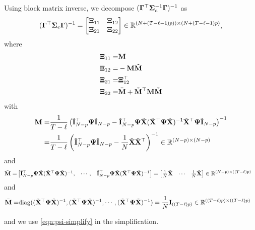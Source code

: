 	Using block matrix inverse, we decompose  $(\bm{\Gamma}^\top \bm{\Sigma}_e^{-1} \bm{\Gamma} )^{-1}$ as 
		\[(\bm{\Gamma}^\top \bm{\Sigma}_e \bm{\Gamma})^{-1} =  \begin{bmatrix} \bm{\Xi}_{11} & \bm{\Xi}_{12} \\ \bm{\Xi}_{21} & \bm{\Xi}_{22} \end{bmatrix}  \in \mathbb{R}^{(N+(T - \ell-1)p)) \times (N+(T - \ell-1)p)},  \]
		where
  \begin{align*}
      \bm{\Xi}_{11} =& \mathbf{M} \\
      \bm{\Xi}_{12} =&  - \mathbf{M} \tilde{\mathbf{M}} \\
      \bm{\Xi}_{21} =& \bm{\Xi}_{12}^\top \\
      \bm{\Xi}_{22} =& \bar{\mathbf{M}} +\tilde{\mathbf{M}}^\top \mathbf{M} \tilde{\mathbf{M}}
  \end{align*}
 with
		\begin{align*}
		    \mathbf{M} =&   \frac{1}{T - \ell} \left( \tilde{\mathbf{I}}_{N-p}^\top \bm{\Psi} \tilde{\mathbf{I}}_{N-p} -\tilde{\mathbf{I}}_{N-p}^\top \bm{\Psi}\tilde{\mathbf{X}} (\tilde{\mathbf{X}}^\top \bm{\Psi}  \tilde{\mathbf{X}})^{-1} \tilde{\mathbf{X}}^\top \bm{\Psi} \tilde{\mathbf{I}}_{N-p}  \right)^{-1}  \\
      =& \frac{1}{T - \ell} \left(  \tilde{\mathbf{I}}_{N-p}^\top \bm{\Psi} \tilde{\mathbf{I}}_{N-p} - \frac{1}{N} \tilde{\mathbf{X}} \tilde{\mathbf{X}}^\top \right)^{-1} \in \mathbb{R}^{(N-p) \times (N-p)}  
		\end{align*}
  and 
  \begin{align*}
      \tilde{\mathbf{M}} =& \begin{bmatrix}\tilde{\mathbf{I}}_{N-p}^\top \bm{\Psi} \tilde{\mathbf{X}} (\tilde{\mathbf{X}}^\top \bm{\Psi}  \tilde{\mathbf{X}})^{-1}, & \cdots,  & \tilde{\mathbf{I}}_{N-p}^\top \bm{\Psi}\tilde{\mathbf{X}} (\tilde{\mathbf{X}}^\top \bm{\Psi}  \tilde{\mathbf{X}})^{-1} \end{bmatrix} = \begin{bmatrix}
				\frac{1}{N} \tilde{\mathbf{X}} & \cdots & \frac{1}{N} \tilde{\mathbf{X}}
			\end{bmatrix} \in \mathbb{R}^{(N-p)\times ((T - \ell)p)} 
  \end{align*}
  and 
  \begin{align*}
      \bar{\mathbf{M}} =& \mathrm{diag}((\tilde{\mathbf{X}}^\top \bm{\Psi} \tilde{\mathbf{X}})^{-1}, (\tilde{\mathbf{X}}^\top \bm{\Psi} \tilde{\mathbf{X}})^{-1},
			\cdots, (\tilde{\mathbf{X}}^\top \bm{\Psi} \tilde{\mathbf{X}})^{-1}) = \frac{1}{N} \mathbf{I}_{((T - \ell)p)} \in \mathbb{R}^{((T - \ell)p) \times ((T - \ell)p)}
  \end{align*}

  
		and we use \eqref{eqn:psi-simplify} in the simplification.


